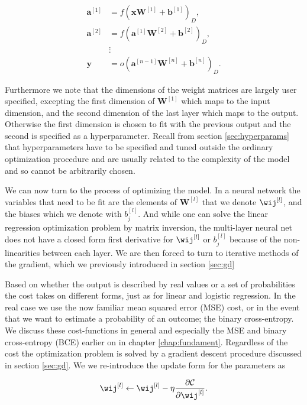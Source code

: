 \begin{align}
\mathbf{a}^{[1]} &= f(\mathbf{x}\mathbf{W}^{[1]}+ \mathbf{b}^{[1]})_D , \\
\mathbf{a}^{[2]} &= f(\mathbf{a}^{[1]}\mathbf{W}^{[2]}+ \mathbf{b}^{[2]})_D , \\
&\vdots \\
\mathbf{y} &= o(\mathbf{a}^{[n-1]}\mathbf{W}^{[n]} + \mathbf{b}^{[n]})_D .
\end{align} 

\noindent Furthermore we note that the dimensions of the weight matrices are largely user specified, excepting the first dimension of $\mathbf{W}^{[1]}$ which maps to the input dimension, and the second dimension of the last layer which maps to the output. Otherwise the first dimension is chosen to fit with the previous output and the second is specified as a hyperparameter. Recall from section \ref{sec:hyperparams} that hyperparameters have to be specified and tuned outside the ordinary optimization procedure and are usually related to the complexity of the model and so cannot be arbitrarily chosen. 

We can now turn to the process of optimizing the model. In a neural network the variables that need to be fit are the elements of $\mathbf{W}^{[l]}$ that we denote $\wij^{[l]}$, and the biases which we denote with $b_j^{[l]}$. And while one can solve the linear regression optimization problem by matrix inversion, the multi-layer neural net does not have a closed form first derivative for $\wij^{[l]}$ or  $b_j^{[l]}$ because of the non-linearities between each layer. We are then forced to turn to iterative methods of the gradient, which we previously introduced in section \ref{sec:gd}

Based on whether the output is described by real values or a set of probabilities the cost takes on different forms, just as for linear and logistic regression. In the real case we use the now familiar mean squared error (MSE) cost, or in the event that we want to estimate a probability of an outcome; the binary cross-entropy. We discuss these cost-functions in general and especially the MSE and binary cross-entropy (BCE) earlier on in chapter \ref{chap:fundament}. Regardless of the cost the optimization problem is solved by a gradient descent procedure discussed in section \ref{sec:gd}. We we re-introduce the update form for the parameters as 

\begin{equation}\label{eq:nn_gd}
	\wij^{[l]} \leftarrow \wij^{[l]} -\eta \frac{\partial \mathcal{C}}{\partial \wij^{[l]}} .
\end{equation}

